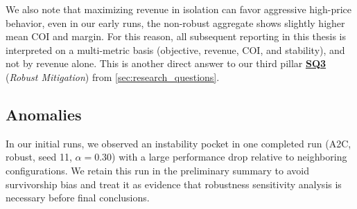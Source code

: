 We also note that maximizing revenue in isolation can favor aggressive high-price behavior, even in our early runs, the non-robust aggregate shows slightly higher mean COI and margin. For this reason, all subsequent reporting in this thesis is interpreted on a multi-metric basis (objective, revenue, COI, and stability), and not by revenue alone. This is another direct answer to our third pillar \hyperlink{sq3}{\textbf{SQ3}} (\textit{Robust Mitigation}) from \cref{sec:research_questions}.


\subsection{Anomalies}
In our initial runs, we observed an instability pocket in one completed run (A2C, robust, seed 11, $\alpha=0.30$) with a large performance drop relative to neighboring configurations. We retain this run in the preliminary summary to avoid survivorship bias and treat it as evidence that robustness sensitivity analysis is necessary before final conclusions.
